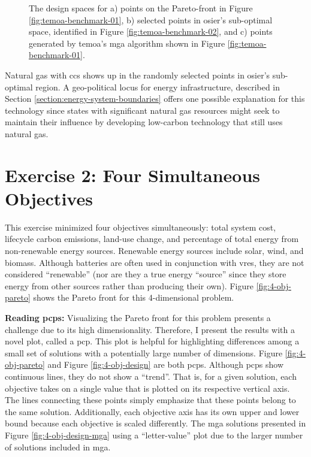 \newpage
\begin{figure}[ht!]
  \centering
  \resizebox{\columnwidth}{!}{}
  \caption{The design spaces for a) points on the Pareto-front in Figure
  \ref{fig:temoa-benchmark-01}, b) selected points in \ac{osier}'s sub-optimal
  space, identified in Figure \ref{fig:temoa-benchmark-02}, and c) points
  generated by \ac{temoa}'s \ac{mga} algorithm shown in Figure
  \ref{fig:temoa-benchmark-01}.}
  \label{fig:temoa-benchmark-03}
\end{figure}

Natural gas with \ac{ccs} shows up in the randomly selected points in
\ac{osier}'s sub-optimal region. A geo-political locus for energy
infrastructure, described in Section \ref{section:energy-system-boundaries}
offers one possible explanation for this technology since states with
significant natural gas resources might seek to maintain their influence by
developing low-carbon technology that still uses natural gas.


\section{Exercise 2: Four Simultaneous Objectives}
This exercise minimized four objectives simultaneously: total system cost, 
lifecycle carbon emissions, land-use change, and percentage of total energy
from non-renewable energy sources. Renewable energy sources include solar,
wind, and biomass. Although batteries are often used in conjunction with
\acp{vre}, they are not considered ``renewable'' (nor are they a true energy
``source'' since they store energy from other sources rather than producing
their own). Figure \ref{fig:4-obj-pareto} shows the Pareto front for this 4-dimensional problem.

\begin{noteBox}
\textbf{Reading \Aclp{pcp}:}
Visualizing the Pareto front for this problem presents a challenge due to its
high dimensionality. Therefore, I present the results with a novel plot, called
a \ac{pcp}. This plot is helpful for highlighting differences among a small set
of solutions with a potentially large number of dimensions. Figure \ref{fig:4-obj-pareto} 
and Figure \ref{fig:4-obj-design} are both \acp{pcp}. Although \acp{pcp} show continuous
lines, they do not show a ``trend''. That is, for a given solution, each objective
takes on a single value that is plotted on its respective vertical axis. The lines 
connecting these points simply emphasize that these points belong to the same solution.
Additionally, each objective axis has its own upper and lower bound because each objective
is scaled differently.
The \ac{mga} solutions presented in Figure \ref{fig:4-obj-design-mga} using a 
``letter-value'' plot due to the larger number of solutions included in \ac{mga}. 
\end{noteBox}


